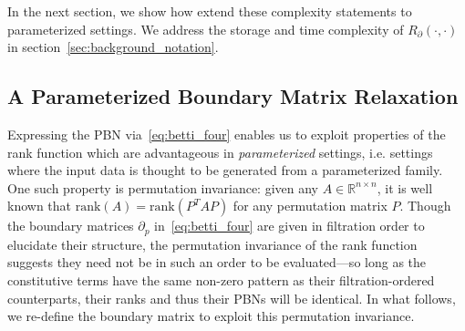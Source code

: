 \documentclass[10pt]{article}
\newcommand{\+}{%
	\raisebox{0.18ex}{\scaleobj{0.55}{+}}
}
\newtheorem{proposition}{Proposition}
\newtheorem{corollary}{Corollary}
\theoremstyle{definition}
\begin{document}

\noindent 
In the next section, we show how extend these complexity statements to parameterized settings. We address the storage and time complexity of $R_\partial(\cdot, \cdot)$ in section~\ref{sec:background_notation}.

\subsection{A Parameterized Boundary Matrix Relaxation}
Expressing the PBN via~\eqref{eq:betti_four} enables us to exploit properties of the rank function which are advantageous in \emph{parameterized} settings, i.e. settings where the input data is  thought to be generated from a parameterized family.  
One such property is permutation invariance: given any $A \in \mathbb{R}^{n \times n}$, it is well known that $\mathrm{rank}(A) = \mathrm{rank}(P^T A P)$ for any permutation matrix $P$. Though  the boundary matrices $\partial_p$ in~\eqref{eq:betti_four} are given in filtration order to elucidate their structure, the permutation invariance of the rank function suggests they need not be in such an order to be evaluated---so long as the constitutive terms have the same non-zero pattern as their filtration-ordered counterparts, their ranks and thus their PBNs will be identical.
In what follows, we re-define the boundary matrix to exploit this permutation invariance. 
 
\end{document}
